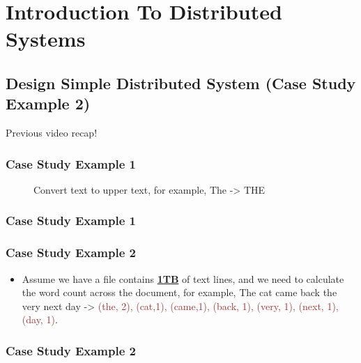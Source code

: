 \section{Introduction To Distributed Systems}
%
\subsection{Design Simple Distributed System (Case Study Example 2)}

\begin{frame}[c]{ }
	\centering     
	
	\textcolor{offgreen}{ \large Previous video recap!}
\end{frame}

\begin{frame}[plain,c]
	\frametitle{Case Study Example 1}
	\begin{figure}
		\centering
		
		\caption{Convert text to upper text, for example, The -> THE } \label{fig:DS3}
	\end{figure}
	
\end{frame}
\begin{frame}[plain,c]
	\frametitle{Case Study Example 1}
	\begin{figure}
		\centering
		
	\end{figure}
	
\end{frame}
\begin{frame}
	\frametitle{Case Study Example 2}
	\begin{itemize}  [<+->]
		\item Assume we have a file contains \textbf{\underline{1TB}} of text lines, and we need to calculate the word count across the document, for example, \textcolor{offyellow}{The cat came back the very next day} -> \textcolor{brown}{(the, 2), (cat,1), (came,1), (back, 1), (very, 1), (next, 1), (day, 1)}.

	\end{itemize}
\end{frame}


\begin{frame}[plain,c]
	\frametitle{Case Study Example 2}
	\begin{figure}
		\centering
		
	\end{figure}
	
\end{frame}

